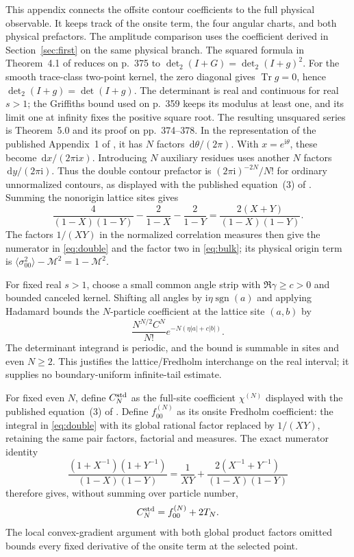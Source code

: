 \documentclass[11pt]{article}
\numberwithin{equation}{section}
\theoremstyle{definition}
\newcommand{\dd}{\,\mathrm d}
\newcommand{\ii}{\mathrm i}
\newcommand{\M}{\mathcal M}
\begin{document}
This appendix connects the offsite contour coefficients to the full
physical observable. It keeps track of the onsite term, the four
angular charts, and both physical prefactors. The amplitude comparison
uses the coefficient derived in Section~\ref{sec:first} on the same
physical branch.
The squared formula in Theorem~4.1 of \cite{PalmerTracy1981}
reduces on p.~375 to \(\det_2(I+G)=\det_2(I+g)^2\).
For the smooth trace-class two-point kernel, the zero diagonal gives
\(\operatorname{Tr}g=0\), hence \(\det_2(I+g)=\det(I+g)\).
The determinant is real and continuous for real \(s>1\);
the Griffiths bound used on p.~359 keeps its modulus at least one,
and its limit one at infinity fixes the positive square root.
The resulting unsquared series is Theorem~5.0 and its proof on
pp.~374--378. In the representation of the published Appendix~1
of \cite{TW2014}, it has
\(N\) factors \(\dd\theta/(2\pi)\).
With \(x=e^{\ii\theta}\), these become \(\dd x/(2\pi\ii x)\).
Introducing \(N\) auxiliary residues uses another \(N\) factors
\(\dd y/(2\pi\ii)\). Thus the double contour prefactor is
\((2\pi\ii)^{-2N}/N!\) for ordinary unnormalized contours,
as displayed with the published equation~(3) of \cite{TW2014}.
Summing the nonorigin lattice sites gives
\[
 \frac4{(1-X)(1-Y)}-\frac2{1-X}-\frac2{1-Y}
 =\frac{2(X+Y)}{(1-X)(1-Y)}.
\]
The factors \(1/(XY)\) in the normalized correlation measures
then give the numerator in \eqref{eq:double} and the factor two
in \eqref{eq:bulk}; its physical origin term is
\(\langle\sigma_{00}^2\rangle-\M^2=1-\M^2\).

For fixed real \(s>1\), choose a small common angle strip with
\(\Re\gamma\ge c>0\) and bounded canceled kernel. Shifting all angles
by \(\ii\eta\operatorname{sgn}(a)\) and applying Hadamard bounds the
\(N\)-particle coefficient at the lattice site \((a,b)\) by
\[
 \frac{N^{N/2}C^N}{N!}
 e^{-N(\eta|a|+c|b|)}.
\]
The determinant integrand is periodic, and the bound is summable in
sites and even \(N\ge2\). This justifies the lattice/Fredholm
interchange on the real interval; it supplies no boundary-uniform
infinite-tail estimate.

For fixed even \(N\), define \(C_N^{\rm std}\) as the full-site
coefficient \(\chi^{(N)}\) displayed with the published equation~(3)
of \cite{TW2014}. Define \(f_{00}^{(N)}\) as its onsite Fredholm
coefficient: the integral in \eqref{eq:double} with its global rational
factor replaced by \(1/(XY)\), retaining the same pair factors,
factorial and measures. The exact numerator identity
\[
 \frac{(1+X^{-1})(1+Y^{-1})}{(1-X)(1-Y)}
 =\frac1{XY}+\frac{2(X^{-1}+Y^{-1})}{(1-X)(1-Y)}
\]
therefore gives, without summing over particle number,
\[
 C_N^{\rm std}=f_{00}^{(N)}+2T_N.
\]
The local convex-gradient argument with both global product factors
omitted bounds every fixed derivative of the onsite term at the
selected point.
\end{document}
